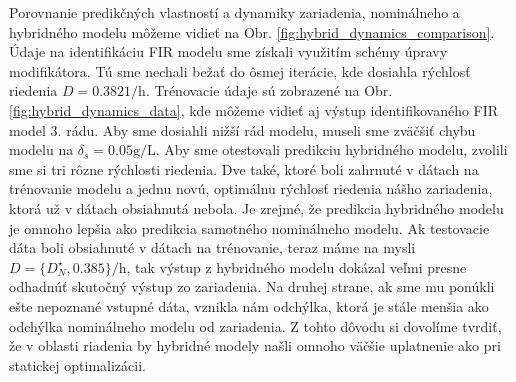 Porovnanie predikčných vlastností a dynamiky zariadenia, nominálneho a hybridného modelu môžeme vidieť na Obr. \ref{fig:hybrid_dynamics_comparison}. Údaje na identifikáciu FIR modelu sme získali využitím schémy úpravy modifikátora. Tú sme nechali bežať do ôsmej iterácie, kde dosiahla rýchlosť riedenia $ D = 0.3821\si{\per\hour} $. Trénovacie údaje sú zobrazené na Obr. \ref{fig:hybrid_dynamics_data}, kde môžeme vidieť aj výstup identifikovaného FIR model 3. rádu. Aby sme dosiahli nižší rád modelu, museli sme zväčšiť chybu modelu na $ \delta_{s} = 0.05\si{\gram\per\liter} $. Aby sme otestovali predikciu hybridného modelu, zvolili sme si tri rôzne rýchlosti riedenia. Dve také, ktoré boli zahrnuté v dátach na trénovanie modelu a jednu novú, optimálnu rýchlosť riedenia nášho zariadenia, ktorá už v dátach obsiahnutá nebola. Je zrejmé, že predikcia hybridného modelu je omnoho lepšia ako predikcia samotného nominálneho modelu. Ak testovacie dáta boli obsiahnuté v dátach na trénovanie, teraz máme na mysli $D = \lbrace D_{N}^{\star}, 0.385 \rbrace\si{\per\hour} $, tak výstup z hybridného modelu dokázal veľmi presne odhadnúť skutočný výstup zo zariadenia. Na druhej strane, ak sme mu ponúkli ešte nepoznané vstupné dáta, vznikla nám odchýlka, ktorá je stále menšia ako odchýlka nominálneho modelu od zariadenia. Z tohto dôvodu si dovolíme tvrdiť, že v oblasti riadenia by hybridné modely našli omnoho väčšie uplatnenie ako pri statickej optimalizácii.

